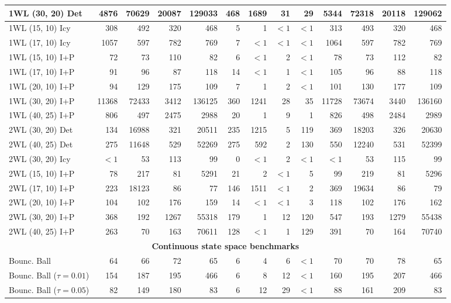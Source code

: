 {\begin{tabular}{|l|rrrr|rrrr|rrrr|}
1WL (30, 20) Det & 4876 & 70629 & 20087 & 129033 & 468 & 1689 & 31 & 29 & 5344 & 72318 & 20118 & 129062 \\
\hline
1WL (15, 10) Icy & 308 & 492 & 320 & 468 & 5 & 1 & ${<}1$ & ${<}1$ & 313 & 493 & 320 & 468 \\
1WL (17, 10) Icy & 1057 & 597 & 782 & 769 & 7 & ${<}1$ & ${<}1$ & ${<}1$ & 1064 & 597 & 782 & 769 \\
\hline
1WL (15, 10) I+P & 72 & 73 & 110 & 82 & 6 & ${<}1$ & 2 & ${<}1$ & 78 & 73 & 112 & 82 \\
1WL (17, 10) I+P & 91 & 96 & 87 & 118 & 14 & ${<}1$ & 1 & ${<}1$ & 105 & 96 & 88 & 118 \\
1WL (20, 10) I+P & 94 & 129 & 175 & 109 & 7 & 1 & 2 & ${<}1$ & 101 & 130 & 177 & 109 \\
1WL (30, 20) I+P & 11368 & 72433 & 3412 & 136125 & 360 & 1241 & 28 & 35 & 11728 & 73674 & 3440 & 136160 \\
1WL (40, 25) I+P & 806 & 497 & 2475 & 2988 & 20 & 1 & 9 & 1 & 826 & 498 & 2484 & 2989 \\
\hline
2WL (30, 20) Det & 134 & 16988 & 321 & 20511 & 235 & 1215 & 5 & 119 & 369 & 18203 & 326 & 20630 \\
2WL (40, 25) Det & 275 & 11648 & 529 & 52269 & 275 & 592 & 2 & 130 & 550 & 12240 & 531 & 52399 \\
\hline
2WL (30, 20) Icy & ${<}1$ & 53 & 113 & 99 & 0 & ${<}1$ & 2 & ${<}1$ & ${<}1$ & 53 & 115 & 99 \\
\hline
2WL (15, 10) I+P & 78 & 217 & 81 & 5291 & 21 & 2 & ${<}1$ & 5 & 99 & 219 & 81 & 5296 \\
2WL (17, 10) I+P & 223 & 18123 & 86 & 77 & 146 & 1511 & ${<}1$ & 2 & 369 & 19634 & 86 & 79 \\
2WL (20, 10) I+P & 104 & 102 & 176 & 159 & 14 & ${<}1$ & ${<}1$ & 3 & 118 & 102 & 176 & 162 \\
2WL (30, 20) I+P & 368 & 192 & 1267 & 55318 & 179 & 1 & 12 & 120 & 547 & 193 & 1279 & 55438 \\
2WL (40, 25) I+P & 263 & 70 & 163 & 70611 & 128 & ${<}1$ & 1 & 129 & 391 & 70 & 164 & 70740 \\
\hline
\multicolumn{13}{|c|}{\textbf{Continuous state space benchmarks}}\\\hline
Bounc. Ball & 64 & 66 & 72 & 65 & 6 & 4 & 6 & ${<}1$ & 70 & 70 & 78 & 65 \\
Bounc. Ball ($\tau=0.01$) & 154 & 187 & 195 & 466 & 6 & 8 & 12 & ${<}1$ & 160 & 195 & 207 & 466 \\
Bounc. Ball ($\tau=0.05$) & 82 & 149 & 180 & 83 & 6 & 12 & 29 & ${<}1$ & 88 & 161 & 209 & 83 \\

\end{tabular}}
